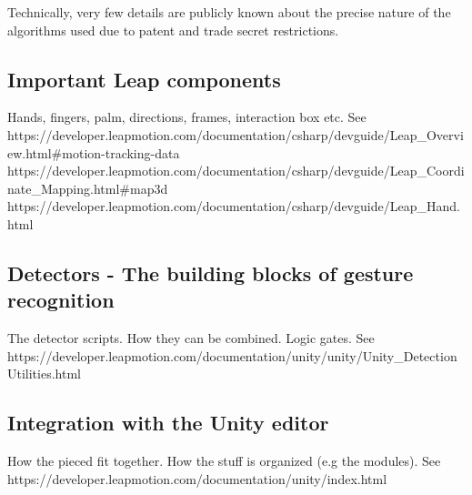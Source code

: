 Technically, very few details are publicly known about the precise nature of the algorithms used due to patent and trade secret restrictions.

\subsection{Important Leap components}
Hands, fingers, palm, directions, frames, interaction box etc. See \\
https://developer.leapmotion.com/documentation/csharp/devguide/Leap\_Overview.html\#motion-tracking-data \\
https://developer.leapmotion.com/documentation/csharp/devguide/Leap\_Coordinate\_Mapping.html\#map3d \\
https://developer.leapmotion.com/documentation/csharp/devguide/Leap\_Hand.html \\


\subsection{Detectors - The building blocks of gesture recognition}
The detector scripts. How they can be combined. Logic gates. 
See https://developer.leapmotion.com/documentation/unity/unity/Unity\_DetectionUtilities.html

\subsection{Integration with the Unity editor}
How the pieced fit together. How the stuff is organized (e.g the modules).
See https://developer.leapmotion.com/documentation/unity/index.html